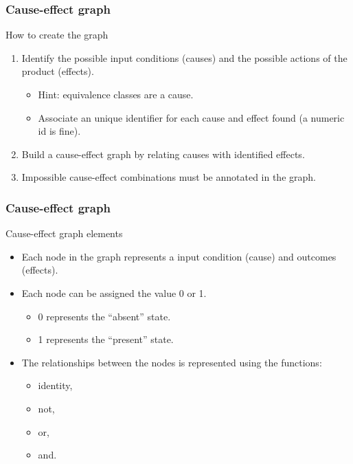 \begin{frame}
\frametitle{Cause-effect graph}

\begin{block:procedure}{How to create the graph}
\begin{enumerate}
	\item Identify the possible input conditions (causes) and the possible
	actions of the product (effects).
	\begin{itemize}
		\item Hint: equivalence classes are a cause.
		\item Associate an unique identifier for each cause and effect found
		(a numeric id is fine).
	\end{itemize}

	\item Build a cause-effect graph by relating causes with identified
	effects.

    \item Impossible cause-effect combinations must be annotated in the graph.
\end{enumerate}
\end{block:procedure}
\end{frame}


\begin{frame}
\frametitle{Cause-effect graph}

\begin{block:fact}{Cause-effect graph elements}
\begin{itemize}
	\item Each node in the graph represents a input condition (cause) and
	outcomes (effects).

	\item Each node can be assigned the value 0 or 1.
	\begin{itemize}
		\item 0 represents the ``absent'' state.
		\item 1 represents the ``present'' state.
	\end{itemize}

	\item The relationships between the nodes is represented using the
	functions:
	\begin{itemize}
		\item identity,
		\item not,
		\item or,
		\item and.
	\end{itemize}
\end{itemize}
\end{block:fact}
\end{frame}



